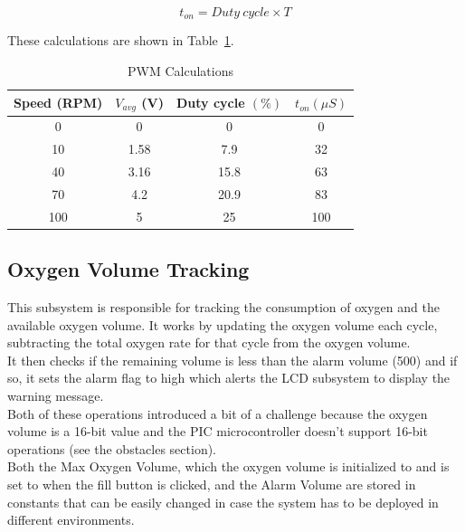 \documentclass[a4paper, 12pt]{article}
\begin{document}
\begin{equation*}
    t_{on} = Duty \: cycle \times T
\end{equation*}

These calculations are shown in Table~\ref{tab:pwm_calculations}.
\begin{table}[h]
\begin{center}
 \def\arraystretch{1.5}
 \begin{tabular}{|c|c|c|c|} 

 \hline
 Speed (RPM) & $V_{avg}$ (V) & Duty cycle $(\%)$ & $t_{on} (\mu S)$ \\ [0.5ex] 
 \hline\hline
 0 & 0 & 0 & 0 \\ 
 \hline
10 & 1.58 & 7.9 & 32 \\ 
 \hline
  40 & 3.16 & 15.8 & 63 \\ 
 \hline
 70 & 4.2 & 20.9 & 83 \\
\hline
100 & 5 & 25 & 100\\ [1ex] 
 \hline
\end{tabular}\caption{PWM Calculations} \label{tab:pwm_calculations}
\end{center}
\end{table}


\subsection{Oxygen Volume Tracking}
This subsystem is responsible for tracking the consumption of oxygen and the available oxygen volume. It works by updating the oxygen volume each cycle, subtracting the total oxygen rate for that cycle from the oxygen volume. \\

It then checks if the remaining volume is less than the alarm volume (500) and if so, it sets the alarm flag to high which alerts the LCD subsystem to display the warning message. \\

Both of these operations introduced a bit of a challenge because the oxygen volume is a 16-bit value and the PIC microcontroller doesn’t support 16-bit operations (see the obstacles section). \\

Both the Max Oxygen Volume, which the oxygen volume is initialized to and is set to when the fill button is clicked, and the Alarm Volume are stored in constants that can be easily changed in case the system has to be deployed in different environments. \\
\end{document}
